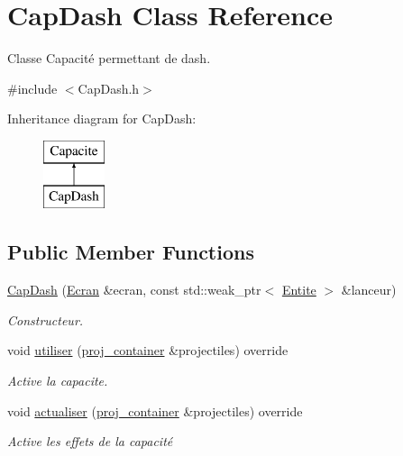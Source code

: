 \hypertarget{class_cap_dash}{}\section{Cap\+Dash Class Reference}
\label{class_cap_dash}


Classe Capacité permettant de dash.  




{\ttfamily \#include $<$Cap\+Dash.\+h$>$}

Inheritance diagram for Cap\+Dash\+:\begin{figure}[H]
\begin{center}
\leavevmode
\includegraphics[height=2.000000cm]{class_cap_dash}
\end{center}
\end{figure}
\subsection*{Public Member Functions}
\begin{DoxyCompactItemize}
\item 
\mbox{\hyperlink{class_cap_dash_af069a87108b24e34bece7567699a625e}{Cap\+Dash}} (\mbox{\hyperlink{class_ecran}{Ecran}} \&ecran, const std\+::weak\+\_\+ptr$<$ \mbox{\hyperlink{class_entite}{Entite}} $>$ \&lanceur)
\begin{DoxyCompactList}\small\item\em Constructeur. \end{DoxyCompactList}\item 
void \mbox{\hyperlink{class_cap_dash_aa7c16bdf13761c0bf761bd417cffdcc9}{utiliser}} (\mbox{\hyperlink{def__type_8h_a87980cd8ee9533e561a73e8bbc728188}{proj\+\_\+container}} \&projectiles) override
\begin{DoxyCompactList}\small\item\em Active la capacite. \end{DoxyCompactList}\item 
void \mbox{\hyperlink{class_cap_dash_a09dce88d953b9b6c4b53cdcb168236ab}{actualiser}} (\mbox{\hyperlink{def__type_8h_a87980cd8ee9533e561a73e8bbc728188}{proj\+\_\+container}} \&projectiles) override
\begin{DoxyCompactList}\small\item\em Active les effets de la capacité \end{DoxyCompactList}\end{DoxyCompactItemize}
